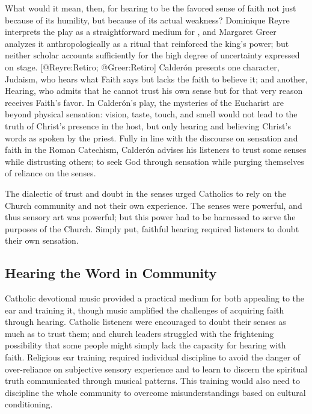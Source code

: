 What would it mean, then, for hearing to be the favored sense of faith not just because of its humility, but because of its actual weakness?  Dominique Reyre interprets the play as a straightforward medium for , and Margaret Greer analyzes it anthropologically as a ritual that reinforced the king's power; but neither scholar accounts sufficiently for the high degree of uncertainty expressed on stage.
[@Reyre:Retiro; @Greer:Retiro]
Calderón presents one character, Judaism, who hears what Faith says but lacks the faith to believe it; and another, Hearing, who admits that he cannot trust his own sense but for that very reason receives Faith's favor.
In Calderón's play, the mysteries of the Eucharist are beyond physical sensation: vision, taste, touch, and smell would not lead to the truth of Christ's presence in the host, but only hearing and believing Christ's words  as spoken by the priest.
Fully in line with the discourse on sensation and faith in the Roman Catechism, Calderón advises his listeners to trust some senses while distrusting others; to seek God through sensation while purging themselves of reliance on the senses.

The dialectic of trust and doubt in the senses urged Catholics to rely on the Church community and not their own experience.
The senses were powerful, and thus sensory art was powerful; but this power had to be harnessed to serve the purposes of the Church.
Simply put, faithful hearing required listeners to doubt their own sensation.


\subsection{Hearing the Word in Community}


Catholic devotional music provided a practical medium for both appealing to the ear and training it, though music amplified the challenges of acquiring faith through hearing.
Catholic listeners were encouraged to doubt their senses as much as to trust them; and church leaders struggled with the frightening possibility that some people might simply lack the capacity for hearing with faith.
Religious ear training required individual discipline to avoid the danger of over-reliance on subjective sensory experience and to learn to discern the spiritual truth communicated through musical patterns.
This training would also need to discipline the whole community to overcome misunderstandings based on cultural conditioning.

